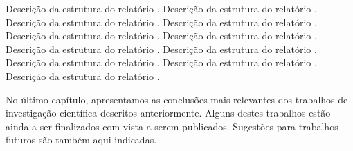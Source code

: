 Descrição da estrutura do relatório . Descrição da estrutura do
relatório . Descrição da estrutura do relatório . Descrição da estrutura
do relatório . Descrição da estrutura do relatório . Descrição da
estrutura do relatório . Descrição da estrutura do relatório . Descrição
da estrutura do relatório . Descrição da estrutura do relatório
. Descrição da estrutura do relatório . Descrição da estrutura do
relatório .

No último capítulo, apresentamos as conclusões mais relevantes
dos trabalhos de investigação científica descritos anteriormente.
Alguns destes trabalhos estão ainda a ser finalizados com vista a serem
publicados. Sugestões para trabalhos futuros são também aqui indicadas.
